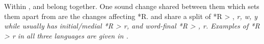 
Within , 
and  belong together.
One sound change shared between them which sets them apart from
 are the changes affecting *R.
 and  share a split of *R > {\0}, \it{r, w, y}
while  usually has initial/medial *R > \it{r},
and word-final *R > {\0}, \it{r}.
Examples of *R > \it{r} in all three languages are given in .

